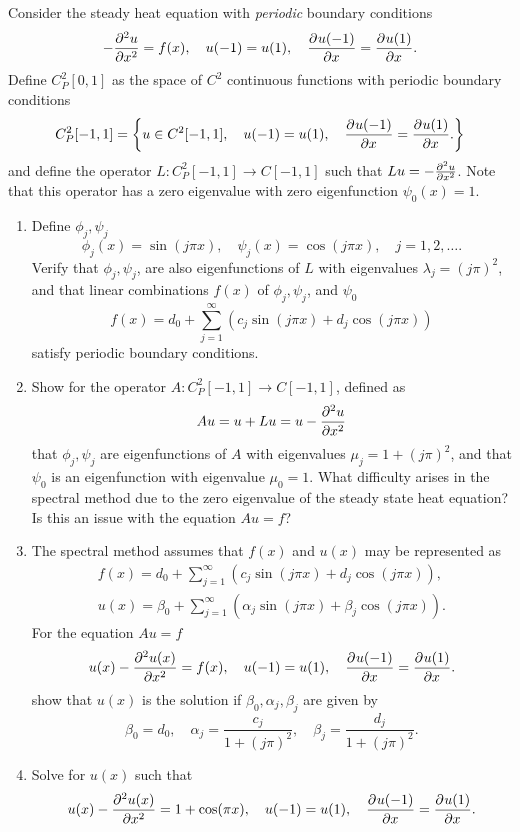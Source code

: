 Consider the steady heat equation with \emph{periodic} boundary conditions
\[
-\frac{\partial^{2} u}{\partial x^{2}} = f(x), \quad u(-1) = u(1), \quad \frac{\partial^{} u(-1)}{\partial x^{}} = \frac{\partial^{} u(1)}{\partial x^{}}.
\]
Define $C^2_P[0,1]$ as the space of $C^2$ continuous functions with periodic boundary conditions
\[
C^2_P[-1,1] = \left\{ 
u\in C^2[-1,1], \quad u(-1) = u(1), \quad \frac{\partial^{} u(-1)}{\partial x^{}} = \frac{\partial^{} u(1)}{\partial x^{}}.
\right\}
\]
and define the operator $L:C^2_P[-1,1]\rightarrow C[-1,1]$ such that $Lu = -\frac{\partial^{2} u}{\partial x^{2}}$. Note that this operator has a zero eigenvalue with zero eigenfunction $\psi_0(x) = 1$. 

\begin{enumerate}
\item Define $\phi_j, \psi_j$ 
\[
\phi_j(x) = \sin(j\pi x), \quad \psi_j(x) = \cos(j\pi x), \quad j = 1,2,\ldots.
\]
Verify that $\phi_j,\psi_j$, are also eigenfunctions of $L$ with eigenvalues $\lambda_j = (j\pi)^2$, and that linear combinations $f(x)$ of $\phi_j,\psi_j$, and $\psi_0$
\[
f(x) = d_0 + \sum_{j = 1}^\infty \left( c_j \sin(j\pi x) + d_j \cos(j\pi x)\right)
\]
satisfy periodic boundary conditions.
\item Show for the operator $A:C^2_P[-1,1]\rightarrow C[-1,1]$, defined as
\[
Au = u + Lu = u - \frac{\partial^{2} u}{\partial x^{2}}
\]
that $\phi_j, \psi_j$ are eigenfunctions of $A$ with eigenvalues $\mu_j = 1 + (j\pi)^2$, and that $\psi_0$ is an eigenfunction with eigenvalue $\mu_0 = 1$. 
What difficulty arises in the spectral method due to the zero eigenvalue of the steady state heat equation?  Is this an issue with the equation $Au = f$?
\item The spectral method assumes that $f(x)$ and $u(x)$ may be represented as
\begin{align*}
f(x) = d_0 + \sum_{j = 1}^\infty \left( c_j \sin(j\pi x) + d_j \cos(j\pi x)\right),\\
u(x) = \beta_0 + \sum_{j=1}^\infty \left( \alpha_j \sin(j\pi x) + \beta_j \cos(j\pi x) \right).
\end{align*}
For the equation $Au = f$
\[
u(x) - \frac{\partial^{2} u(x)}{\partial x^{2}} = f(x), \quad u(-1) = u(1), \quad \frac{\partial^{} u(-1)}{\partial x^{}} = \frac{\partial^{} u(1)}{\partial x^{}}.
\]
show that $u(x)$ is the solution if $\beta_0, \alpha_j, \beta_j$ are given by
\[
\beta_0 = d_0, \quad \alpha_j = \frac{c_j}{1+(j\pi)^2}, \quad \beta_j = \frac{d_j}{1+(j\pi)^2}.
\]
\item Solve for $u(x)$ such that
\[
u(x) - \frac{\partial^{2} u(x)}{\partial x^{2}} = 1 + \cos(\pi x), \quad u(-1) = u(1), \quad \frac{\partial^{} u(-1)}{\partial x^{}} = \frac{\partial^{} u(1)}{\partial x^{}}.
\]
\end{enumerate}